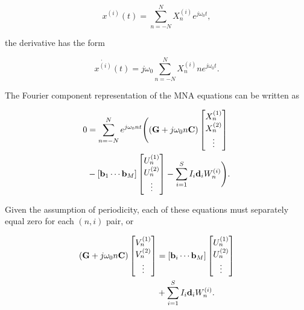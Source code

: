 \begin{equation}\label{eqn:ece1254projectReport:500}
x^{(i)}(t) = \sum_{n=-N}^N X_n^{(i)} e^{j \omega_0 t},
\end{equation}

the derivative has the form

\begin{equation}\label{eqn:ece1254projectReport:520}
\dot{x^{(i)}}(t) = j \omega_0 \sum_{n=-N}^N X_n^{(i)} n e^{j \omega_0 t}.
\end{equation}

The Fourier component representation of the MNA equations can be written as

\begin{equation}\label{eqn:ece1254projectReport:600}
\begin{aligned}
0 &= \sum_{n = -N}^N e^{j \omega_0 n t}
\Biglr{
   \lr{ \BG + j \omega_0 n \BC }
\begin{bmatrix}
X_n^{(1)} \\
X_n^{(2)} \\
\vdots \\
\end{bmatrix} \\
&-
[ \Bb_1 \cdots \Bb_M ]
\begin{bmatrix}
U_n^{(1)} \\
U_n^{(2)} \\
\vdots \\
\end{bmatrix}
- \sum_{i = 1}^S I_i \Bd_i
W_n^{(i)}
}.
\end{aligned}
\end{equation}

Given the
assumption of periodicity, each of these equations must separately equal zero for each \( ( n, i ) \) pair, or

\begin{equation}\label{eqn:ece1254projectReport:540}
\begin{aligned}
\lr{
\BG + j \omega_0 n \BC
}
\begin{bmatrix}
V_n^{(1)} \\
V_n^{(2)} \\
\vdots \\
\end{bmatrix}
&=
[\Bb_i \cdots \Bb_M]
\begin{bmatrix}
U_n^{(1)} \\
U_n^{(2)} \\
\vdots \\
\end{bmatrix} \\
&+ \sum_{i = 1}^S I_i \Bd_i
W_n^{(i)}
.
\end{aligned}
\end{equation}

